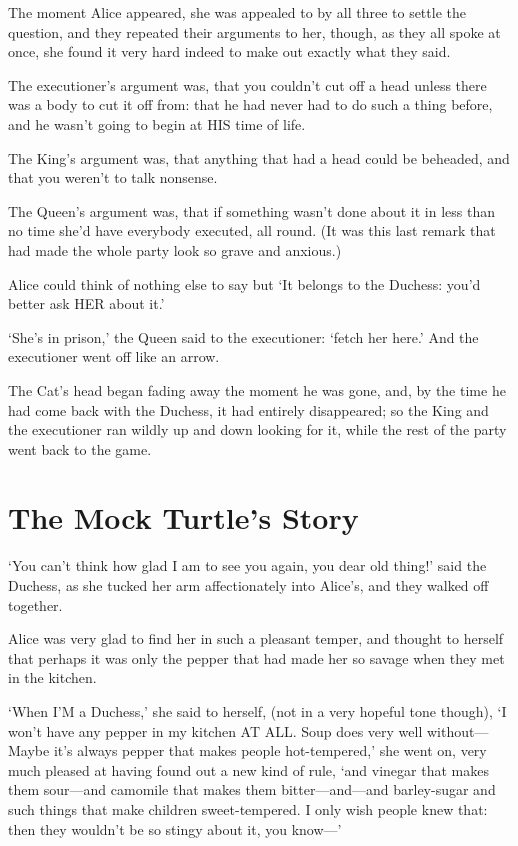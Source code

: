 \documentclass[12pt]{article}
\begin{document}
\begin{Parallel}[p]{}{}
{The moment Alice appeared, she was appealed to by all three to settle the question, and they repeated their arguments to her, though, as they all spoke at once, she found it very hard indeed to make out exactly what they said.

The executioner’s argument was, that you couldn’t cut off a head unless there was a body to cut it off from: that he had never had to do such a thing before, and he wasn’t going to begin at HIS time of life.

The King’s argument was, that anything that had a head could be beheaded, and that you weren’t to talk nonsense.

The Queen’s argument was, that if something wasn’t done about it in less than no time she’d have everybody executed, all round. (It was this last remark that had made the whole party look so grave and anxious.)

Alice could think of nothing else to say but ‘It belongs to the Duchess: you’d better ask HER about it.’

‘She’s in prison,’ the Queen said to the executioner: ‘fetch her here.’ And the executioner went off like an arrow.

 The Cat’s head began fading away the moment he was gone, and, by the time he had come back with the Duchess, it had entirely disappeared; so the King and the executioner ran wildly up and down looking for it, while the rest of the party went back to the game.




\section{The Mock Turtle’s Story}

‘You can’t think how glad I am to see you again, you dear old thing!’ said the Duchess, as she tucked her arm affectionately into Alice’s, and they walked off together.

Alice was very glad to find her in such a pleasant temper, and thought to herself that perhaps it was only the pepper that had made her so savage when they met in the kitchen.

‘When I’M a Duchess,’ she said to herself, (not in a very hopeful tone though), ‘I won’t have any pepper in my kitchen AT ALL. Soup does very well without—Maybe it’s always pepper that makes people hot-tempered,’ she went on, very much pleased at having found out a new kind of rule, ‘and vinegar that makes them sour—and camomile that makes them bitter—and—and barley-sugar and such things that make children sweet-tempered. I only wish people knew that: then they wouldn’t be so stingy about it, you know—’

}
\end{Parallel}
\end{document}

